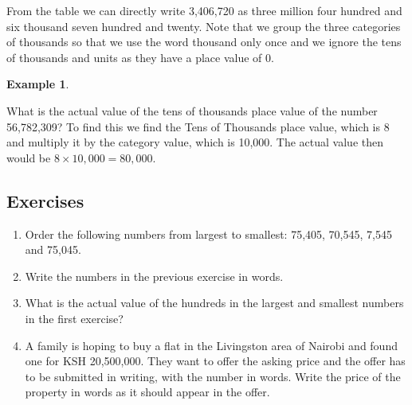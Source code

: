 \documentclass[11pt, oneside]{article}
\theoremstyle{definition}
\newtheorem{exmp}{Example}[section]
\begin{document}
From the table we can directly write 3,406,720 as three million four hundred and six thousand seven hundred and twenty. Note that we group the three categories of thousands so that we use the word thousand only once and we ignore the tens of thousands and units as they have a place value of 0. 

\begin{exmp} \end{exmp}
What is the actual value of the tens of thousands place value of the number 56,782,309? To find this we find the Tens of Thousands place value, which is 8 and multiply it by the category value, which is 10,000. The actual value then would be $8\times 10,000 = 80,000$.
 

\subsection{Exercises}
\begin{enumerate}
\item Order the following numbers from largest to smallest: 75,405, 70,545, 7,545 and 75,045.
\item Write the numbers in the previous exercise in words.
\item What is the actual value of the hundreds in the largest and smallest numbers in the first exercise?
\item A family is hoping to buy a flat in the Livingston area of Nairobi and found one for KSH 20,500,000. They want to offer the asking price and the offer has to be submitted in writing, with the number in words. Write the price of the property in words as it should appear in the offer.
\end{enumerate}
\end{document}
